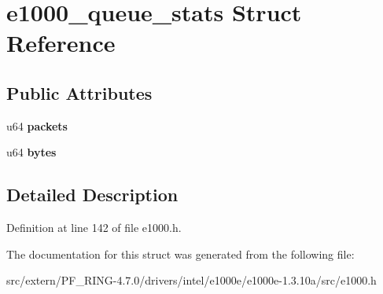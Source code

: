\hypertarget{structe1000__queue__stats}{
\section{e1000\_\-queue\_\-stats Struct Reference}
\label{structe1000__queue__stats}
}
\subsection*{Public Attributes}
\begin{DoxyCompactItemize}
\item 
\hypertarget{structe1000__queue__stats_aed6b27ccecca26b5ef8989c381a6bb92}{
u64 {\bfseries packets}}
\label{structe1000__queue__stats_aed6b27ccecca26b5ef8989c381a6bb92}

\item 
\hypertarget{structe1000__queue__stats_a56f318504648f5afb9f3d1a940a72ee9}{
u64 {\bfseries bytes}}
\label{structe1000__queue__stats_a56f318504648f5afb9f3d1a940a72ee9}

\end{DoxyCompactItemize}


\subsection{Detailed Description}


Definition at line 142 of file e1000.h.



The documentation for this struct was generated from the following file:\begin{DoxyCompactItemize}
\item 
src/extern/PF\_\-RING-\/4.7.0/drivers/intel/e1000e/e1000e-\/1.3.10a/src/e1000.h\end{DoxyCompactItemize}
